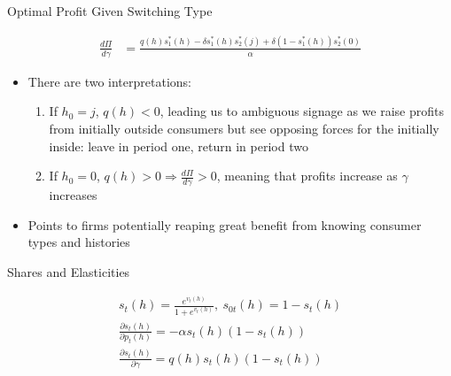 \documentclass[aspectratio=169,professionalfonts]{beamer}
\newcommand{\shortbuttons}{}
\begin{document}
\gdef\shortbuttons{\hyperlink{short-10}{\beamergotobutton{Back to First Period Optimization}}}
\begin{frame}[label=short-11,noframenumbering]{Optimal Profit Given Switching Type}
  \begin{tcolorbox}
    [
    boxsep=0pt,
    left=2pt, right=2pt,
    top=1pt, bottom=1pt,
    before skip=2pt, after skip=2pt
    ]
    \setlength{\abovedisplayskip}{2pt}
    \setlength{\belowdisplayskip}{2pt}
    \begin{align*}
      \frac{d\Pi}{d\gamma} &= \frac{q(h)s_1^*(h) - \delta s_1^*(h)s_2^*(j) + \delta(1-s_1^*(h))s_2^*(0)}{\alpha}
    \end{align*}
  \end{tcolorbox}
  \begin{itemize}
    \item There are two interpretations:
    \begin{enumerate}
      \item If $h_0=j$, $q(h)<0$, leading us to ambiguous signage as we raise profits from initially outside consumers but see opposing forces for the initially inside: leave in period one, return in period two
      \item If $h_0=0$, $q(h)>0\Rightarrow \frac{d\Pi}{d\gamma} > 0$, meaning that profits increase as $\gamma$ increases
    \end{enumerate}
    \item Points to firms potentially reaping great benefit from knowing consumer types and histories
  \end{itemize}
\end{frame}


\gdef\shortbuttons{\hyperlink{short-10}{\beamergotobutton{Back to First Period Optimization}}}
\begin{frame}[label=short-52,noframenumbering]{Shares and Elasticities}
  \begin{tcolorbox}
    [
    boxsep=0pt,
    left=2pt, right=2pt,
    top=1pt, bottom=1pt,
    before skip=2pt, after skip=2pt
    ]
    \setlength{\abovedisplayskip}{2pt}
    \setlength{\belowdisplayskip}{2pt}
    \begin{gather*}
      s_t(h) = \frac{e^{v_t(h)}}{1+e^{v_t(h)}}, \ s_{0t}(h) = 1-s_t(h) \\
      \frac{\partial s_t(h)}{\partial p_t(h)} = -\alpha s_t(h)(1-s_t(h)) \\
      \frac{\partial s_t(h)}{\partial\gamma} = q(h)s_t(h)(1-s_t(h))
    \end{gather*}
  \end{tcolorbox}
  \end{frame}
\end{document}
